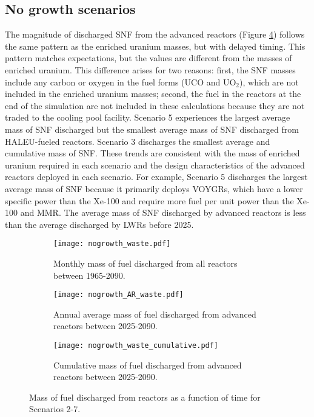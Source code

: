 \subsection{No growth scenarios}
The magnitude of discharged \gls{SNF} from the advanced reactors 
(Figure \ref{fig:nogrowth_waste}) follows the same pattern as the enriched 
uranium masses, but with delayed timing. This pattern matches expectations, 
but the values are different from the masses of enriched uranium. 
This difference arises for two reasons: first, the 
\gls{SNF} masses include any carbon or oxygen in the fuel forms (UCO and 
UO$_2$), which 
are not included in the enriched uranium masses; second, the 
fuel in the reactors at the end of the simulation are not included in these 
calculations because they are not traded to the cooling pool facility.
Scenario 5 experiences the largest average mass of \gls{SNF} 
discharged but the smallest average mass of \gls{SNF} discharged from 
\gls{HALEU}-fueled reactors. 
Scenario 3 discharges the smallest average and cumulative mass of \gls{SNF}.
These trends are consistent with the mass of enriched uranium required 
in each scenario and the design characteristics of the advanced 
reactors deployed in each scenario. For example, Scenario 5 discharges the 
largest average mass of \gls{SNF} because it primarily deploys VOYGRs, which 
have a lower specific power than the Xe-100 and require more fuel per unit 
power than the Xe-100 and \gls{MMR}. 
The average mass of \gls{SNF} discharged by advanced reactors is less than 
the average discharged by \glspl{LWR} before 2025. 

\begin{figure}[h!]
    \centering
    \begin{subfigure}[b]{0.45\textwidth}
        \centering
        \texttt{[image: nogrowth\_waste.pdf]}
        \caption{Monthly mass of fuel discharged from all reactors 
        between 1965-2090.}
        \label{fig:nogrowth_all_waste}
    \end{subfigure}
    \hfill
    \begin{subfigure}[b]{0.45\textwidth}
        \centering
        \texttt{[image: nogrowth\_AR\_waste.pdf]}
        \caption{Annual average mass of fuel discharged from 
        advanced reactors between 2025-2090.}
        \label{fig:nogrowth_AR_waste}
    \end{subfigure}
    \begin{subfigure}[b]{0.45\textwidth}
        \centering
        \texttt{[image: nogrowth\_waste\_cumulative.pdf]}
        \caption{Cumulative mass of fuel discharged from advanced reactors 
        between 2025-2090.}
        \label{fig:nogrowth_waste_cumulative}
    \end{subfigure}
       \caption{Mass of fuel discharged from reactors 
       as a function of time for Scenarios 2-7. }
       \label{fig:nogrowth_waste}
\end{figure}

